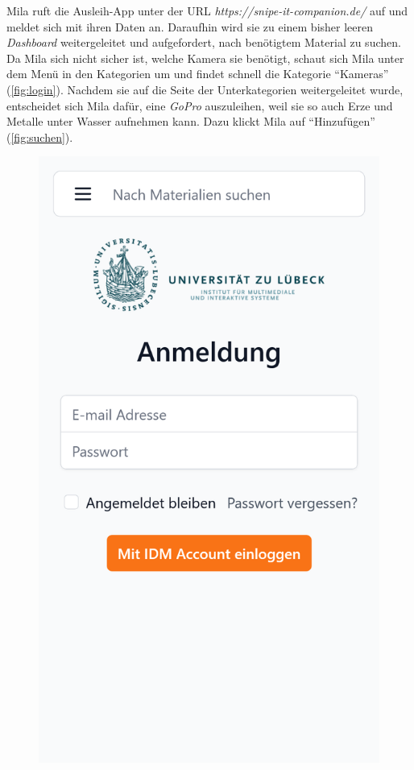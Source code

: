 Mila ruft die Ausleih-App unter der URL \textit{https://snipe-it-companion.de/} auf und meldet sich
mit ihren Daten an. Daraufhin wird sie zu einem bisher leeren \textit{Dashboard} weitergeleitet und
aufgefordert, nach benötigtem Material zu suchen. Da Mila sich nicht sicher ist, welche Kamera sie
benötigt, schaut sich Mila unter dem Menü in den Kategorien um und findet schnell die Kategorie
\enquote{Kameras} (\ref{fig:login}). Nachdem sie auf die Seite der Unterkategorien weitergeleitet
wurde, entscheidet sich Mila dafür, eine \textit{GoPro} auszuleihen, weil sie so auch Erze und
Metalle unter Wasser aufnehmen kann. Dazu klickt Mila auf \enquote{Hinzufügen} (\ref{fig:suchen}).
\begin{figure}[p]
    \centering
    \includegraphics[scale=0.19]{Bilder/Dialgobeispiel/Login.png}

\end{figure}
